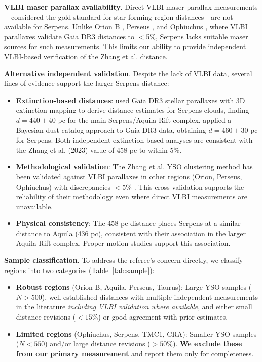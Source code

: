 \documentclass[twoside,twocolumn]{mnras}
\begin{document}
\textbf{VLBI maser parallax availability}. Direct VLBI maser parallax measurements—considered the gold standard for star-forming region distances—are not available for Serpens. Unlike Orion B \citep[e.g.][]{Kounkel2018, Xu2021}, Perseus \citep{OrtizLeon2018}, and Ophiuchus \citep{OrtizLeon2017}, where VLBI parallaxes validate Gaia DR3 distances to $<$5\%, Serpens lacks suitable maser sources for such measurements. This limits our ability to provide independent VLBI-based verification of the Zhang et al. distance.

\textbf{Alternative independent validation}. Despite the lack of VLBI data, several lines of evidence support the larger Serpens distance:
\begin{itemize}
    \item \textbf{Extinction-based distances}: \citet{Yan2022} used Gaia DR3 stellar parallaxes with 3D extinction mapping to derive distance estimates for Serpens clouds, finding $d = 440 \pm 40$ pc for the main Serpens/Aquila Rift complex. \citet{Green2024} applied a Bayesian dust catalog approach to Gaia DR3 data, obtaining $d = 460 \pm 30$ pc for Serpens. Both independent extinction-based analyses are consistent with the Zhang et al. (2023) value of 458 pc to within 5\%.
    \item \textbf{Methodological validation}: The Zhang et al. YSO clustering method has been validated against VLBI parallaxes in other regions (Orion, Perseus, Ophiuchus) with discrepancies $<$5\% \citep[see Figure 12 in][]{Zhang2023}. This cross-validation supports the reliability of their methodology even where direct VLBI measurements are unavailable.
    \item \textbf{Physical consistency}: The 458 pc distance places Serpens at a similar distance to Aquila (436 pc), consistent with their association in the larger Aquila Rift complex. Proper motion studies \citep[e.g.][]{Zucker2020} support this association.
\end{itemize}

\textbf{Sample classification}. To address the referee's concern directly, we classify regions into two categories (Table~\ref{tab:sample}):
\begin{itemize}
    \item \textbf{Robust regions} (Orion B, Aquila, Perseus, Taurus): Large YSO samples ($N > 500$), well-established distances with multiple independent measurements in the literature \emph{including VLBI validation where available}, and either small distance revisions ($<15\%$) or good agreement with prior estimates.
    \item \textbf{Limited regions} (Ophiuchus, Serpens, TMC1, CRA): Smaller YSO samples ($N < 550$) and/or large distance revisions ($>50\%$). \textbf{We exclude these from our primary measurement} and report them only for completeness.
\end{itemize}
\end{document}
